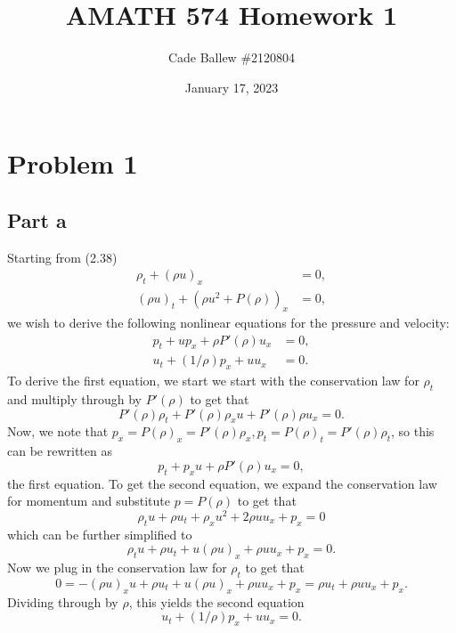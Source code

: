 \documentclass{article}
\title{AMATH 574 Homework 1}
\author{Cade Ballew \#2120804}
\date{January 17, 2023}
\begin{document}
	
\maketitle
	
\section{Problem 1}
\subsection{Part a}
Starting from (2.38)
\begin{equation*}
	\begin{split}
		\rho_t + (\rho u)_x &= 0,\\
		(\rho u)_t + (\rho u^2+P(\rho))_x &= 0,
	\end{split} 
\end{equation*} we wish to derive the following nonlinear equations for the pressure and velocity:
\begin{equation*}
	\begin{split}
		p_t + up_x + \rho P'(\rho) u_x &= 0,\\
		u_t + (1/\rho)p_x + uu_x &= 0.
	\end{split} 
\end{equation*}
To derive the first equation, we start we start with the conservation law for $\rho_t$ and multiply through by $P'(\rho)$ to get that
\[
P'(\rho)\rho_t + P'(\rho)\rho_xu+P'(\rho)\rho u_x=0.
\]
Now, we note that  $p_x=P(\rho)_x = P'(\rho)\rho_x,p_t=P(\rho)_t = P'(\rho)\rho_t$, so this can be rewritten as 
\[
p_t+p_xu+\rho P'(\rho)u_x=0,
\]
the first equation. To get the second equation, we expand the conservation law for momentum and substitute $p=P(\rho)$ to get that
\[
\rho_tu+\rho u_t+\rho_xu^2+2\rho uu_x+p_x=0
\] 
which can be further simplified to
\[
\rho_tu+\rho u_t+u(\rho u)_x+\rho uu_x+p_x=0.
\]
Now we plug in the conservation law for $\rho_t$ to get that 
\[
0=-(\rho u)_xu+\rho u_t+u(\rho u)_x+\rho uu_x+p_x=\rho u_t+\rho uu_x+p_x.
\]
Dividing through by $\rho$, this yields the second equation
\[
u_t + (1/\rho)p_x + uu_x = 0.
\]
\end{document}
